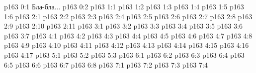 \author{Промежуточные создания}
\vs p163 0:1  Бла-бла...
\vs p163 0:2 
\vs p163 1:1 
\vs p163 1:2 
\vs p163 1:3 
\vs p163 1:4 
\vs p163 1:5 
\vs p163 1:6 
\vs p163 2:1 
\vs p163 2:2 \pc 
\vs p163 2:3 
\vs p163 2:4 \pc 
\vs p163 2:5 
\vs p163 2:6 
\vs p163 2:7 \pc 
\vs p163 2:8 
\vs p163 2:9 
\vs p163 2:10 
\vs p163 2:11 
\vs p163 3:1 
\vs p163 3:2 
\vs p163 3:3 
\vs p163 3:4 
\vs p163 3:5 
\vs p163 3:6 
\vs p163 3:7 
\vs p163 4:1 
\vs p163 4:2 
\vs p163 4:3 
\vs p163 4:4 
\vs p163 4:5 
\vs p163 4:6 
\vs p163 4:7 
\vs p163 4:8 
\vs p163 4:9 \pc 
\vs p163 4:10 
\vs p163 4:11 
\vs p163 4:12 
\vs p163 4:13 
\vs p163 4:14 
\vs p163 4:15 
\vs p163 4:16 \pc 
\vs p163 4:17 
\vs p163 5:1 
\vs p163 5:2 
\vs p163 5:3 
\vs p163 6:1 
\vs p163 6:2 
\vs p163 6:3 
\vs p163 6:4 
\vs p163 6:5 
\vs p163 6:6 \pc 
\vs p163 6:7 
\vs p163 6:8 \pc 
{}
\vs p163 7:1 
\vs p163 7:2 
\vs p163 7:3 
\vs p163 7:4 
\quizlink
